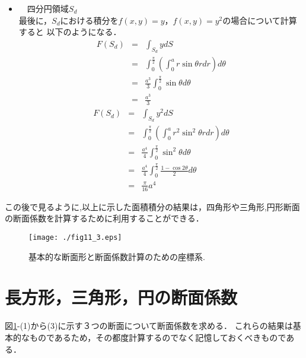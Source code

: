 ﻿\documentclass[10pt,a4j]{jbook}
\begin{document}
\begin{itemize}
\item　四分円領域$S_d$\\
最後に，$S_d$における積分を$f(x,y)=y$，$f(x,y)=y^2$の場合について計算すると
以下のようになる．
\begin{eqnarray}
	F(S_d) 
	&=& \int_{S_d} y dS \nonumber \\
	&=& \int_0^\frac{\pi}{2} \left( \int_0^a r\sin\theta rdr \right)d\theta \nonumber \\
	&=& \frac{a^3}{3}\int_0^\frac{\pi}{2} \sin\theta  d\theta \nonumber \\
	&=& \frac{a^3}{3}
	\label{eqn:int_Sd_y}
\end{eqnarray}
\begin{eqnarray}
	F(S_d) 
	&=& \int_{S_d} y^2 dS \nonumber \\
	&=& \int_0^\frac{\pi}{2} \left( \int_0^a r^2\sin^2\theta rdr \right)d\theta \nonumber \\
	&=& \frac{a^4}{4}\int_0^\frac{\pi}{2} \sin^2\theta d\theta \nonumber \\
	&=& \frac{a^4}{4} \int_0^\frac{\pi}{2} \frac{1-\cos 2\theta}{2} d\theta 
	\nonumber
	\\
	&=& \frac{\pi}{16}a^4
	\label{eqn:int_Sd_y2}
\end{eqnarray}
\end{itemize}
この後で見るように,以上に示した面積積分の結果は，四角形や三角形,円形断面の断面係数を計算するために利用することができる．
\begin{figure}[h]
	\begin{center}
	\texttt{[image: ./fig11\_3.eps]} 
	\end{center}
	\caption{
		基本的な断面形と断面係数計算のための座標系.
	} 
	\label{fig:fig11_3}
\end{figure}
\section{長方形，三角形，円の断面係数}
図\ref{fig:fig11_3}-(1)から(3)に示す３つの断面について断面係数を求める．
これらの結果は基本的なものであるため，その都度計算するのでなく記憶しておくべきものである．
\end{document}
